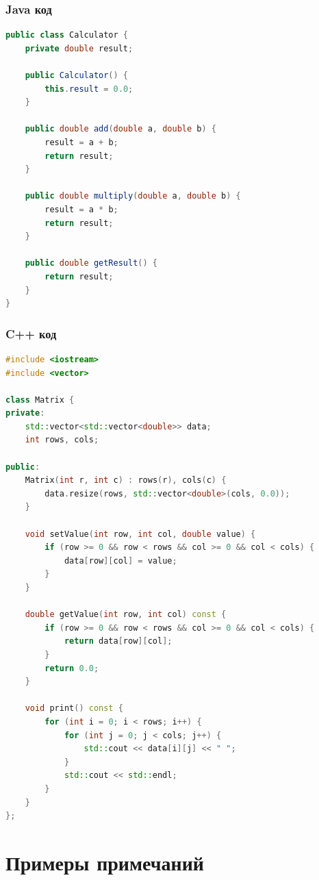 \subsubsection{Java код}

\begin{lstlisting}[style=code, language=Java, caption={Пример Java класса}, label={lst:java_example}]
public class Calculator {
    private double result;
    
    public Calculator() {
        this.result = 0.0;
    }
    
    public double add(double a, double b) {
        result = a + b;
        return result;
    }
    
    public double multiply(double a, double b) {
        result = a * b;
        return result;
    }
    
    public double getResult() {
        return result;
    }
}
\end{lstlisting}

\subsubsection{C++ код}

\begin{lstlisting}[style=code, language=C++, caption={Пример C++ класса}, label={lst:cpp_example}]
#include <iostream>
#include <vector>

class Matrix {
private:
    std::vector<std::vector<double>> data;
    int rows, cols;
    
public:
    Matrix(int r, int c) : rows(r), cols(c) {
        data.resize(rows, std::vector<double>(cols, 0.0));
    }
    
    void setValue(int row, int col, double value) {
        if (row >= 0 && row < rows && col >= 0 && col < cols) {
            data[row][col] = value;
        }
    }
    
    double getValue(int row, int col) const {
        if (row >= 0 && row < rows && col >= 0 && col < cols) {
            return data[row][col];
        }
        return 0.0;
    }
    
    void print() const {
        for (int i = 0; i < rows; i++) {
            for (int j = 0; j < cols; j++) {
                std::cout << data[i][j] << " ";
            }
            std::cout << std::endl;
        }
    }
};
\end{lstlisting}

\section{Примеры примечаний}

